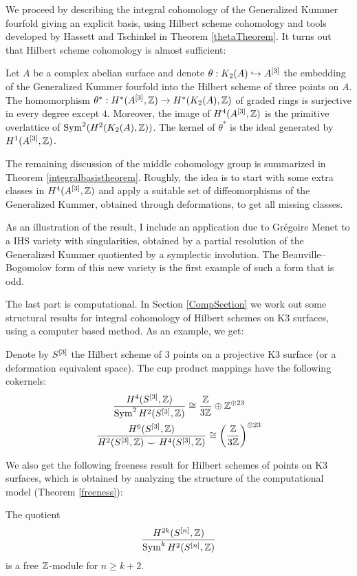 We proceed by describing the integral cohomology of the Generalized Kummer fourfold giving an explicit basis, using Hilbert scheme cohomology and tools developed by Hassett and Tschinkel in Theorem \ref{thetaTheorem}. It turns out that Hilbert scheme cohomology is almost sufficient:
\begin{theorem}
Let $A$ be a complex abelian surface and denote $\theta: \kum{A}{2}\hookrightarrow A^{[3]}$ the embedding of the Generalized Kummer fourfold into the Hilbert scheme of three points on $A$.
The homomorphism $\theta^*:H^*(A\hilb{3},\Z)\rightarrow H^*(\kum{A}{2},\Z)$ of graded rings is surjective in every degree except $4$. Moreover, the image of $H^4(A\hilb{3},\Z)$ is the primitive overlattice of $\Sym^2(H^2(\kum{A}{2},\Z))$. 
The kernel of $\theta^*$ is the ideal generated by $H^1(A\hilb{3},\Z)$.
\end{theorem}
The remaining discussion of the middle cohomology group is summarized in Theorem \ref{integralbasistheorem}. Roughly, the idea is to start with some extra classes in $H^4(A\hilb{3},\Z)$ and apply a suitable set of diffeomorphisms of the Generalized Kummer, obtained through deformations, to get all missing classes.

As an illustration of the result, I include an application due to Gr\'egoire Menet to a IHS variety with singularities, obtained by a partial resolution of the Generalized Kummer quotiented by a symplectic involution. The Beauville--Bogomolov form of this new variety is the first example of such a form that is odd.

The last part \cite{Kapfer2} is computational. In Section \ref{CompSection} we work out some structural results for integral cohomology of Hilbert schemes on K3 surfaces, using a computer based method. As an example, we get:
\begin{theorem}
Denote by $S\hilb{3}$ the Hilbert scheme of 3 points on a projective K3 surface (or a deformation equivalent space).
The cup product mappings have the following cokernels:
\begin{gather*}
\frac{H^4(S\hilb{3},\IZ)}{\Sym^2 H^2(S\hilb{3},\IZ)}  \cong \frac{\IZ}{3\IZ} \oplus \IZ^ {\oplus 23}\\
\frac{H^6(S\hilb{3},\IZ)}{H^2(S\hilb{3},\IZ)\smile H^4(S\hilb{3},\IZ)} \cong \left(\frac{\IZ}{3\IZ}\right)^{\oplus 23}
\end{gather*}
\end{theorem}
We also get the following freeness result for Hilbert schemes of points on K3 surfaces, which is obtained by analyzing the structure of the computational model (Theorem \ref{freeness}):
\begin{theorem}
The quotient
$$
 \frac{H^{2k}(S\hilb{n},\IZ)}{\Sym^k H^{2}(S\hilb{n},\IZ)}
$$
is a free $\IZ$-module for $n\geq k+2$.
\end{theorem}

